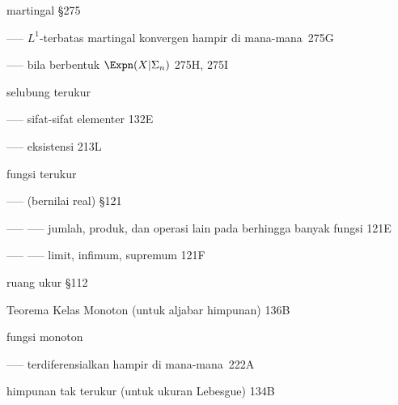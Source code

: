 martingal \S275

----- $L^1$-terbatas martingal konvergen hampir di mana-mana\ 275G


----- bila berbentuk $\Expn(X|\Sigma_n)$ 275H, 275I





selubung terukur

----- sifat-sifat elementer 132E

----- eksistensi 213L


fungsi terukur

----- (bernilai real) \S121

----- ----- jumlah, produk, dan operasi lain pada berhingga banyak fungsi 121E

----- ----- limit, infimum, supremum 121F



























ruang ukur \S112













 Teorema Kelas Monoton (untuk aljabar himpunan) 136B

 fungsi monoton

----- terdiferensialkan hampir di mana-mana\ 222A

\indexmedskip















 himpunan tak terukur (untuk ukuran Lebesgue) 134B

